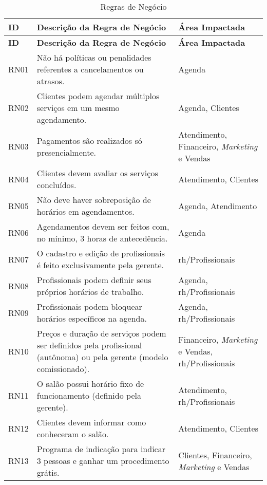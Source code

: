 \begin{longtable}{|p{1.2cm}|p{10cm}|p{4cm}|}
	\caption{Regras de Negócio} \label{tab:regras_de_negócio}\\
	\hline
	\textbf{ID} & \textbf{Descrição da Regra de Negócio} & \textbf{Área Impactada} \\
	\hline
	\endfirsthead
	
	\hline
	\textbf{ID} & \textbf{Descrição da Regra de Negócio} & \textbf{Área Impactada} \\
	\hline
	\endhead
	
	RN01 & Não há políticas ou penalidades referentes a cancelamentos ou atrasos. & Agenda \\
	\hline
	RN02 & Clientes podem agendar múltiplos serviços em um mesmo agendamento. & Agenda, Clientes \\
	\hline
	RN03 & Pagamentos são realizados só presencialmente. & Atendimento, Financeiro, \emph{Marketing} e Vendas \\
	\hline
	RN04 & Clientes devem avaliar os serviços concluídos. & Atendimento, Clientes \\
	\hline
	RN05 & Não deve haver sobreposição de horários em agendamentos. & Agenda, Atendimento \\
	\hline
	RN06 & Agendamentos devem ser feitos com, no mínimo, 3 horas de antecedência. & Agenda \\
	\hline
	RN07 & O cadastro e edição de profissionais é feito exclusivamente pela gerente. & \gls{rh}/Profissionais \\
	\hline
	RN08 & Profissionais podem definir seus próprios horários de trabalho. & Agenda, \gls{rh}/Profissionais \\
	\hline
	RN09 & Profissionais podem bloquear horários específicos na agenda. & Agenda, \gls{rh}/Profissionais \\
	\hline
	RN10 & Preços e duração de serviços podem ser definidos pela profissional (autônoma) ou pela gerente (modelo comissionado). & Financeiro, \emph{Marketing} e Vendas, \gls{rh}/Profissionais \\
	\hline
	RN11 & O salão possui horário fixo de funcionamento (definido pela gerente). & Atendimento, \gls{rh}/Profissionais \\
	\hline
	RN12 & Clientes devem informar como conheceram o salão. & Atendimento, Clientes \\
	\hline
	RN13 & Programa de indicação para indicar 3 pessoas e ganhar um procedimento grátis. & Clientes, Financeiro, \emph{Marketing} e Vendas \\

\end{longtable}
